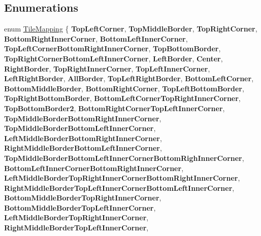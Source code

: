 \subsection*{Enumerations}
\begin{DoxyCompactItemize}
\item 
enum \mbox{\hyperlink{namespace_super_mario_1_1_level_components_a6fb13645a44790821090630fdf2b1afd}{Tile\+Mapping}} \{ \newline
{\bfseries Top\+Left\+Corner}, 
{\bfseries Top\+Middle\+Border}, 
{\bfseries Top\+Right\+Corner}, 
{\bfseries Bottom\+Right\+Inner\+Corner}, 
\newline
{\bfseries Bottom\+Left\+Inner\+Corner}, 
{\bfseries Top\+Left\+Corner\+Bottom\+Right\+Inner\+Corner}, 
{\bfseries Top\+Bottom\+Border}, 
{\bfseries Top\+Right\+Corner\+Bottom\+Left\+Inner\+Corner}, 
\newline
{\bfseries Left\+Border}, 
{\bfseries Center}, 
{\bfseries Right\+Border}, 
{\bfseries Top\+Right\+Inner\+Corner}, 
\newline
{\bfseries Top\+Left\+Inner\+Corner}, 
{\bfseries Left\+Right\+Border}, 
{\bfseries All\+Border}, 
{\bfseries Top\+Left\+Right\+Border}, 
\newline
{\bfseries Bottom\+Left\+Corner}, 
{\bfseries Bottom\+Middle\+Border}, 
{\bfseries Bottom\+Right\+Corner}, 
{\bfseries Top\+Left\+Bottom\+Border}, 
\newline
{\bfseries Top\+Right\+Bottom\+Border}, 
{\bfseries Bottom\+Left\+Corner\+Top\+Right\+Inner\+Corner}, 
{\bfseries Top\+Bottom\+Border2}, 
{\bfseries Bottom\+Right\+Corner\+Top\+Left\+Inner\+Corner}, 
\newline
{\bfseries Top\+Middle\+Border\+Bottom\+Right\+Inner\+Corner}, 
{\bfseries Top\+Middle\+Border\+Bottom\+Left\+Inner\+Corner}, 
{\bfseries Left\+Middle\+Border\+Bottom\+Right\+Inner\+Corner}, 
{\bfseries Right\+Middle\+Border\+Bottom\+Left\+Inner\+Corner}, 
\newline
{\bfseries Top\+Middle\+Border\+Bottom\+Left\+Inner\+Corner\+Bottom\+Righ\+Inner\+Corner}, 
{\bfseries Bottom\+Left\+Inner\+Corner\+Bottom\+Right\+Inner\+Corner}, 
{\bfseries Left\+Middle\+Border\+Top\+Right\+Inner\+Corner\+Bottom\+Right\+Inner\+Corner}, 
{\bfseries Right\+Middle\+Border\+Top\+Left\+Inner\+Corner\+Bottom\+Left\+Inner\+Corner}, 
\newline
{\bfseries Bottom\+Middle\+Border\+Top\+Right\+Inner\+Corner}, 
{\bfseries Bottom\+Middle\+Border\+Top\+Left\+Inner\+Corner}, 
{\bfseries Left\+Middle\+Border\+Top\+Right\+Inner\+Corner}, 
{\bfseries Right\+Middle\+Border\+Top\+Left\+Inner\+Corner}, 

\end{DoxyCompactItemize}
